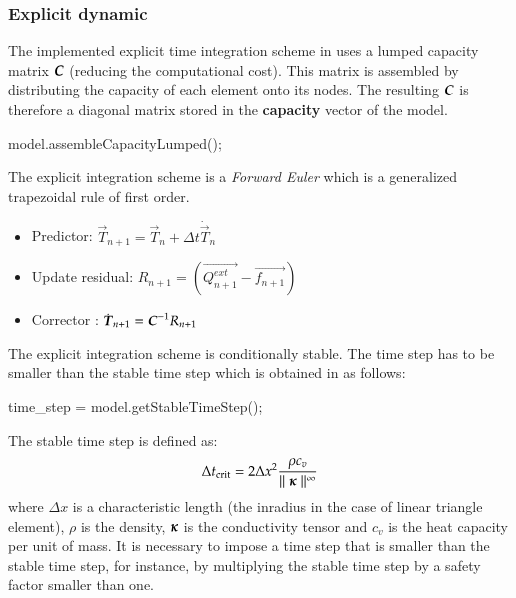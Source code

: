 \subsubsection{Explicit dynamic}

The implemented explicit  time integration scheme in \akantu  uses a lumped capacity
matrix $\boldsymbol{C}$ (reducing the computational  cost). This matrix is assembled by
distributing the capacity of each element onto its nodes. The resulting $\boldsymbol{C}$ is
therefore a diagonal matrix stored in the \textbf{capacity} vector of the model.


\begin{cpp}
  model.assembleCapacityLumped();
\end{cpp}

The explicit integration scheme is a  {\it Forward Euler} 
\cite{curnier92a} which is a generalized trapezoidal rule of first order.

\begin{itemize}
\item Predictor: $\vec{T}_{n+1} = \vec{T}_{n} + \Delta t \dot{\vec{T}}_{n}$
\item Update residual: $R_{n+1} = \left( \vec{Q^{ext}_{n+1}} - \vec{f_{n+1}} \right)$
\item Corrector : $\dot{\boldsymbol{T}}_{n+1} = \boldsymbol{C}^{-1} R_{n+1}$
\end{itemize}

The explicit integration scheme is conditionally stable. The time step has to be
smaller than the stable time step which is obtained in \akantu as follows:

\begin{cpp}
  time_step = model.getStableTimeStep();
\end{cpp}

The stable time step is defined as:
\begin{equation}\label{eqn:smm:explicit:stabletime}
  \Delta t_{{\mathrm{crit}}} = 2 \Delta x^2 \frac{\rho c_v}{\mid\mid \boldsymbol{\kappa} \mid\mid^\infty}
\end{equation}
where $\Delta  x$ is a  characteristic length (\eg  the inradius in the  case of
linear triangle  element), $\rho$ is the density, $\boldsymbol{\kappa}$ is the conductivity tensor
and $c_v$ is the heat capacity per unit of mass. It is
necessary to impose a  time step that is smaller than the  stable time step, for
instance, by  multiplying the stable time  step by a safety  factor smaller than
one.

